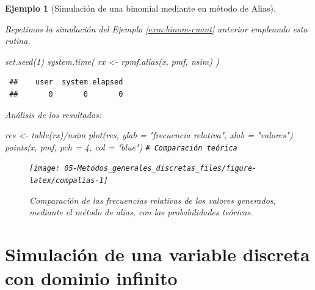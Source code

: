 \documentclass[
  10pt,
]{book}
\newenvironment{Shaded}{\begin{snugshade}}{\end{snugshade}}
\newcommand{\AttributeTok}[1]{\textcolor[rgb]{0.77,0.63,0.00}{#1}}
\newcommand{\CommentTok}[1]{\textcolor[rgb]{0.56,0.35,0.01}{\textit{#1}}}
\newcommand{\DecValTok}[1]{\textcolor[rgb]{0.00,0.00,0.81}{#1}}
\newcommand{\FunctionTok}[1]{\textcolor[rgb]{0.00,0.00,0.00}{#1}}
\newcommand{\NormalTok}[1]{#1}
\newcommand{\OtherTok}[1]{\textcolor[rgb]{0.56,0.35,0.01}{#1}}
\newcommand{\SpecialCharTok}[1]{\textcolor[rgb]{0.00,0.00,0.00}{#1}}
\newcommand{\StringTok}[1]{\textcolor[rgb]{0.31,0.60,0.02}{#1}}
\theoremstyle{break}
\newtheorem{example}{Ejemplo}[chapter]
\theoremstyle{nonumberplain}
\renewcommand{\CommentTok}[1]{\textcolor[rgb]{0.41,0.41,0.41}{\texttt{#1}}}
\begin{document}
\begin{example}[Simulación de una binomial mediante en método de Alias]
\protect\hypertarget{exm:binom-alias}{}\label{exm:binom-alias}

Repetimos la simulación del Ejemplo \ref{exm:binom-cuant} anterior empleando esta rutina.

\begin{Shaded}
\begin{Highlighting}[]
\FunctionTok{set.seed}\NormalTok{(}\DecValTok{1}\NormalTok{)}
\FunctionTok{system.time}\NormalTok{( rx }\OtherTok{\textless{}{-}} \FunctionTok{rpmf.alias}\NormalTok{(x, pmf, nsim) )}
\end{Highlighting}
\end{Shaded}

\begin{verbatim}
 ##    user  system elapsed 
 ##       0       0       0
\end{verbatim}

Análisis de los resultados:

\begin{Shaded}
\begin{Highlighting}[]
\NormalTok{res }\OtherTok{\textless{}{-}} \FunctionTok{table}\NormalTok{(rx)}\SpecialCharTok{/}\NormalTok{nsim}
\FunctionTok{plot}\NormalTok{(res, }\AttributeTok{ylab =} \StringTok{"frecuencia relativa"}\NormalTok{, }\AttributeTok{xlab =} \StringTok{"valores"}\NormalTok{)}
\FunctionTok{points}\NormalTok{(x, pmf, }\AttributeTok{pch =} \DecValTok{4}\NormalTok{, }\AttributeTok{col =} \StringTok{"blue"}\NormalTok{)  }\CommentTok{\# Comparación teórica}
\end{Highlighting}
\end{Shaded}

\begin{figure}[!htbp]

{\centering \texttt{[image: 05-Metodos\_generales\_discretas\_files/figure-latex/compalias-1]} 

}

\caption{Comparación de las frecuencias relativas de los valores generados, mediante el método de alias, con las probabilidades teóricas.}\label{fig:compalias}
\end{figure}

\end{example}

\hypertarget{simulaciuxf3n-de-una-variable-discreta-con-dominio-infinito}{%
\section{Simulación de una variable discreta con dominio infinito}\label{simulaciuxf3n-de-una-variable-discreta-con-dominio-infinito}}
\end{document}
